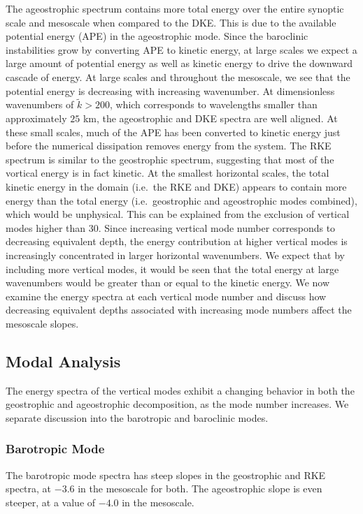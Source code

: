 The ageostrophic spectrum contains more total energy over the entire synoptic scale and mesoscale when compared to the DKE. This is due to the available potential energy (APE) in the ageostrophic mode. Since the baroclinic instabilities grow by converting APE to kinetic energy, at large scales we expect a large amount of potential energy as well as kinetic energy to drive the downward cascade of energy. At large scales and throughout the mesoscale, we see that the potential energy is decreasing with increasing wavenumber. At dimensionless wavenumbers of  $\tilde{k} > 200$, which corresponds to wavelengths smaller than approximately $25$ km, the ageostrophic and DKE spectra are well aligned. At these small scales, much of the APE has been converted to kinetic energy just before the numerical dissipation removes energy from the system. The RKE spectrum is similar to the geostrophic spectrum, suggesting that most of the vortical energy is in fact kinetic. At the smallest horizontal scales, the total kinetic energy in the domain (i.e.\ the RKE and DKE) appears to contain more energy than the total energy (i.e.\ geostrophic and ageostrophic modes combined), which would be unphysical. This can be explained from the exclusion of vertical modes higher than 30. Since increasing vertical mode number corresponds to decreasing equivalent depth, the energy contribution at higher vertical modes is increasingly concentrated in larger horizontal wavenumbers. We expect that by including more vertical modes, it would be seen that the total energy at large wavenumbers would be greater than or equal to the kinetic energy. We now examine the energy spectra at each vertical mode number and discuss how decreasing equivalent depths associated with increasing mode numbers affect the mesoscale slopes.\\

\subsection{Modal Analysis}
The energy spectra of the vertical modes exhibit a changing behavior in both the geostrophic and ageostrophic decomposition, as the mode number increases.  We separate discussion into the barotropic and baroclinic modes.\\

\subsubsection{Barotropic Mode}
The barotropic mode spectra has steep slopes in the geostrophic and RKE spectra, at $-3.6$ in the mesoscale for both. The ageostrophic slope is even steeper, at a value of $-4.0$ in the mesoscale. \\

